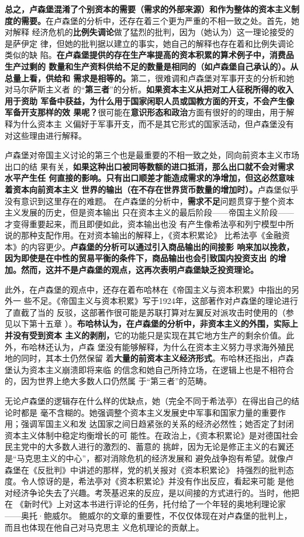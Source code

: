 \textbf{总之，卢森堡混淆了个别资本的需要（需求的外部来源）和作为整体的资本主义制
  度的需要。}在卢森堡的分析中，还存在着三个更为严重的不相一致之处。首先，她对解释
经济危机的\textbf{比例失调论}做了猛烈的批判，因为（她认为）这一理论接受的是萨伊定
律，但她的批判据以建立的事实，她自己的解释也存在着和比例失调论类似的缺
陷。\textbf{在卢森堡提供的存在生产率提高的资本积累的算术例子中，消费品生产过剩的
  数量和生产资料供给不足的数量是相同的（如卢森堡自己承认的）。从总量上看，供给和
  需求是相等的。}第二，很难调和卢森堡对军事开支的分析和她对马尔萨斯主义者
的“\textbf{第三者}”的分析。\textbf{如果资本主义从把对工人征税所得的收入用于资助
  军备中获益，为什么用于国家闲职人员或国教方面的开支，不会产生像军备开支那样的效
  果呢？}很可能在\textbf{意识形态和政治}方面有很好的的理由，用于解释为什么资本主
义偏好于军事开支，而不是其它形式的国家活动，但卢森堡没有对这些理由进行解释。

卢森堡对帝国主义讨论的第三个也是最重要的不相一致之处，同向前资本主义市场出口的结
果有关，\textbf{如果这种出口被同等数额的进口抵消，那么出口就不会对需求水平产生任
  何直接的影响。只有出口顺差才能造成需求的净增加，但这必然意味着资本向前资本主义
  世界的输出（在不存在世界货币数量的增加时）。}卢森堡似乎没有意识到这里存在的难题。
在卢森堡的分析中，\textbf{需求不足}问题贯穿于整个资本主义发展的历史，但是资本输出
只在资本主义的最后阶段——帝国主义阶段——才变得重要起来，而且即便如此，资本输出也没
有产生像希法亭和列宁模型中所说的那种支配作用。在对资本输出的解释上，《资本积累论》
比希法亭《金融资本》的内容更少。\textbf{卢森堡的分析可以通过引入商品输出的间接影
  响来加以挽救，因为即使是在中性的贸易平衡的条件下，商品输出也会引致国内投资支出
  的增加。然而，这并不是卢森堡的观点，这再次表明卢森堡缺乏投资理论。}

此外，在卢森堡的观点中，还存在着布哈林在《帝国主义与资本积累》中指出的另外一
些不足。《帝国主义与资本积累》写于1924年，这部著作对卢森堡的理论进行了直截了当的
反驳，这部著作很可能是苏联打算对左翼反对派攻击时使用的（参见以下第十五章
）。\textbf{布哈林认为，在卢森堡的分析中，非资本主义的外围，实际上并没有受到资本
  主义的剥削，}它的功能只是实现在其它地方生产的剩余价值。此外，布哈林还认为，卢森
堡没有能够解释，为什么在资本主义努力寻求海外殖民地的同时，其本土仍然保留
着\textbf{大量的前资本主义经济形式}。布哈林还指出，卢森堡认为资本主义崩溃即将来临
的信念和她自己所持立场，在逻辑上也是不相符合的，因为世界上绝大多数人口仍然属
于“第三者”的范畴。

无论卢森堡的逻辑存在什么样的优缺点，她（完全不同于希法亭）在得出自己的结论时都是
毫不含糊的。她强调整个资本主义发展史中军事和国家力量的重要作用；强调军国主义和发
达国家之间日趋紧张的关系的经济必然性；她否定了封闭资本主义体制中稳定均衡增长的可
能性。在政治上，《资本积累论》是对德国社会民主党中的大多数人进行的激烈的、蓄意的
挑衅，因为无论是修正主义的右翼还是“马克思主义的中心”，都对消除危机的经济发展和
避免战争抱有希望。就像卢森堡在《反批判》中讲述的那样，党的机关报对《资本积累论》
持强烈的批判态度。令人惊讶的是，希法亭对《资本积累论》并没有作出反应，看起来可能
是他对经济争论失去了兴趣。考茨基迟来的反应，是以间接的方式进行的。当时，他把在
《新时代》上对这本书进行评论的任务，托付给了一个年轻的奥地利理论家——奥托·鲍威尔。
鲍威尔的文章的重要性，不仅仅体现在对卢森堡的批判上，而且也体现在他自己对马克思主
义危机理论的贡献上。


